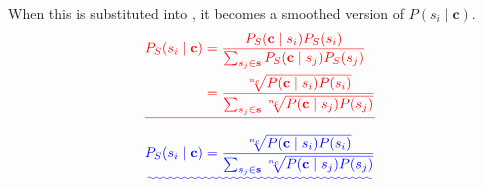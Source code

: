 \documentclass{article} %
\renewcommand{\c}{\mathbf{c}}
\newcommand{\s}{\mathbf{s}}
\providecommand{\DIFadd}[1]{{\protect\color{blue}\uwave{#1}}} %
\providecommand{\DIFdel}[1]{{\protect\color{red}\sout{#1}}}                      %
\providecommand{\DIFaddbegin}{} %
\providecommand{\DIFdelbegin}{} %
\providecommand{\DIFdelend}{} %
\begin{document}
When this is substituted into , it becomes a smoothed version of $P(s_{i} \mid \c)$.
\DIFdelbegin \begin{displaymath} \DIFdel{%
\begin{aligned}
P_S(s_{i}\mid\c) %
&=\dfrac{P_{S}(\c\mid s_{i})P_S(s_{i})}
{\sum_{s_{j}\in\s} P_{S}(\c \mid s_{j}) P_S(s_{j})} \\
%
&=\dfrac{\sqrt[n_c]{P(\c\mid s_{i})P(s_{i})}}
{\sum_{s_{j}\in\s} \sqrt[n_c]{P(\c \mid s_{j})P(s_{j})}} \\
%
\end{aligned}
}\end{displaymath}
\DIFdelend \DIFaddbegin \begin{equation} \DIFadd{\label{eq:generalwsdsmoothed}
\begin{aligned}
P_S(s_{i}\mid\c) %
%
=\dfrac{\sqrt[n_c]{P(\c\mid s_{i})P(s_{i})}}
{\sum_{s_{j}\in\s} \sqrt[n_c]{P(\c \mid s_{j})P(s_{j})}} \\
%
\end{aligned}
}\end{equation}
\end{document}
